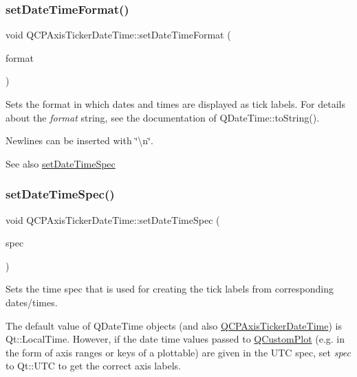 \subsubsection{\texorpdfstring{set\+Date\+Time\+Format()}{setDateTimeFormat()}}
{\footnotesize\ttfamily void Q\+C\+P\+Axis\+Ticker\+Date\+Time\+::set\+Date\+Time\+Format (\begin{DoxyParamCaption}\item[{const Q\+String \&}]{format }\end{DoxyParamCaption})}

Sets the format in which dates and times are displayed as tick labels. For details about the {\itshape format} string, see the documentation of Q\+Date\+Time\+::to\+String().

Newlines can be inserted with \char`\"{}\textbackslash{}n\char`\"{}.

\begin{DoxySeeAlso}{See also}
\hyperlink{class_q_c_p_axis_ticker_date_time_afbd987c7197e42ab61e67fb1c38abebc}{set\+Date\+Time\+Spec} 
\end{DoxySeeAlso}
\mbox{\label{class_q_c_p_axis_ticker_date_time_afbd987c7197e42ab61e67fb1c38abebc}} 
\subsubsection{\texorpdfstring{set\+Date\+Time\+Spec()}{setDateTimeSpec()}}
{\footnotesize\ttfamily void Q\+C\+P\+Axis\+Ticker\+Date\+Time\+::set\+Date\+Time\+Spec (\begin{DoxyParamCaption}\item[{Qt\+::\+Time\+Spec}]{spec }\end{DoxyParamCaption})}

Sets the time spec that is used for creating the tick labels from corresponding dates/times.

The default value of Q\+Date\+Time objects (and also \hyperlink{class_q_c_p_axis_ticker_date_time}{Q\+C\+P\+Axis\+Ticker\+Date\+Time}) is {\ttfamily Qt\+::\+Local\+Time}. However, if the date time values passed to \hyperlink{class_q_custom_plot}{Q\+Custom\+Plot} (e.\+g. in the form of axis ranges or keys of a plottable) are given in the U\+TC spec, set {\itshape spec} to {\ttfamily Qt\+::\+U\+TC} to get the correct axis labels.

